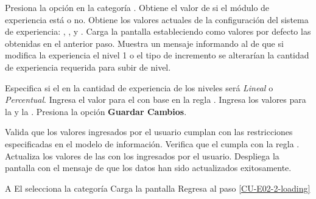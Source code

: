 \begin{UCtrayectoria}%
%
   

  \Actor Presiona la opción {\bf {}} en la categoría
         .  
  \Sistema Obtiene el valor de si el módulo de experiencia está  o no.  \label{CU-E02-2-loading}
  \Sistema Obtiene los valores actuales de la configuración del sistema de experiencia:
           ,
           ,
            y
           .
  \Sistema Carga la pantalla  estableciendo como valores por defecto
           las  obtenidas en el anterior paso.
  \Sistema Muestra un mensaje informando al  de que si 
           modifica la experiencia el nivel 1 o el tipo de incremento se alterarían
           la cantidad de experiencia requerida para subir de nivel.

  \Actor Especifica si el  en la cantidad de
         experiencia de los niveles será {\it Lineal} o {\it Percentual}.
  \Actor Ingresa el valor para el  con
         base en la regla .
  \Actor Ingresa los valores para la  y la
         .
  \Actor Presiona la opción {\bf Guardar Cambios}.  \label{CU-E02-2-submit}

  \Sistema Valida que los valores ingresados por el usuario cumplan con las
           restricciones especificadas en el modelo de información.
  \Sistema Verifica que el  cumpla
           con la regla . 
  \Sistema Actualiza los valores de las  con los
           ingresados por el usuario.
  \Sistema Despliega la pantalla  con el mensaje de que los datos
           han sido actualizados exitosamente.

\end{UCtrayectoria}

\begin{UCtrayectoriaA}{A}{
El  selecciona la categoría }
  \Sistema Carga la pantalla 
  \Actor Regresa al paso \ref{CU-E02-2-loading}
\end{UCtrayectoriaA}

